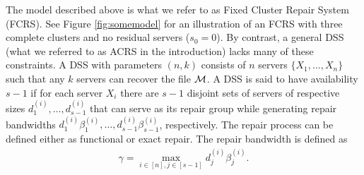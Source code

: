 \documentclass[journal,onecolumn,draftcls]{IEEEtran}
\begin{document}
The model described above is what we refer to as Fixed Cluster Repair System (FCRS). See Figure \ref{fig:somemodel} for an illustration of an FCRS with three complete clusters and no residual servers ($s_0 = 0$). By contrast, a general DSS (what we referred to as ACRS in the introduction) lacks many of these constraints. A DSS with parameters $(n,k)$ consists of $n$ servers $\{X_1,\dots,X_n\}$ such that any $k$ servers can recover the file ${\cal M}$. A DSS is said to have availability $s-1$ if for each server $X_i$ there are $s-1$ disjoint sets of servers of respective sizes $d^{(i)}_1,\dots,d^{(i)}_{s-1}$ that can serve as its repair group while generating repair bandwidths $d^{(i)}_1\beta^{(i)}_1, \dots , d^{(i)}_{s-1}\beta^{(i)}_{s-1}$, respectively. The repair process can be defined either as functional or exact repair. The repair bandwidth is defined as 
\begin{eqnarray}
\gamma = \max_{i\in[n],j\in[s-1]}d^{(i)}_j\beta^{(i)}_j.
\label{eqn:gammaacrs}
\end{eqnarray}
\end{document}
